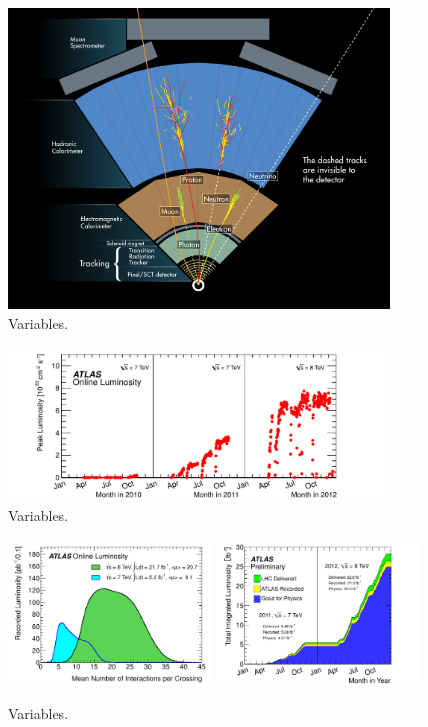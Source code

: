 \begin{figure}[tp]
  \centering
  \includegraphics[width=0.90\textwidth]{figures/lhc-atlas/atlas-wedge-1301009_01.jpg}
  \caption{Variables.}
  \label{fig:atlas-wedge}
\end{figure}

\begin{figure}[tp]
  \centering
  \includegraphics[width=0.90\textwidth]{figures/lhc-atlas/lumivstime}
  \caption{Variables.}
  \label{fig:atlas-lumi-1}
\end{figure}

\begin{figure}[tp]
  \centering
  \includegraphics[width=0.48\textwidth]{figures/lhc-atlas/mu_2011_2012-dec}
  \includegraphics[width=0.48\textwidth]{figures/lhc-atlas/intlumivstime2011-2012DQ}
  \caption{Variables.}
  \label{fig:atlas-lumi-2}
\end{figure}

